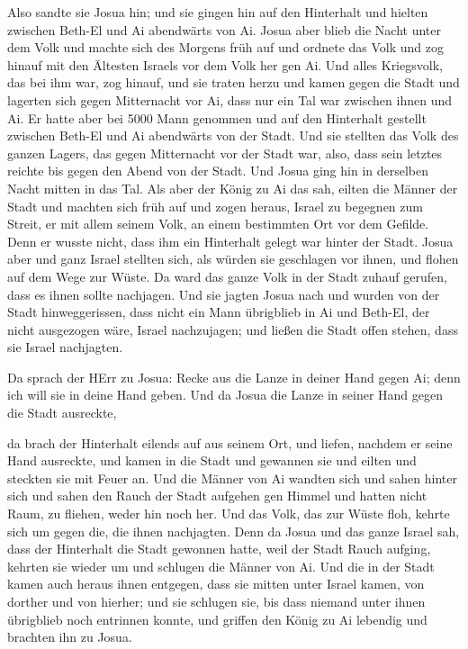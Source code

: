  Also sandte sie Josua hin; und sie gingen hin auf den
Hinterhalt und hielten zwischen Beth-El und Ai abendwärts von Ai. Josua
aber blieb die Nacht unter dem Volk  und machte sich des
Morgens früh auf und ordnete das Volk und zog hinauf mit den Ältesten
Israels vor dem Volk her gen Ai.  Und alles Kriegsvolk, das
bei ihm war, zog hinauf, und sie traten herzu und kamen gegen die Stadt
und lagerten sich gegen Mitternacht vor Ai, dass nur ein Tal war
zwischen ihnen und Ai.  Er hatte aber bei 5000 Mann
genommen und auf den Hinterhalt gestellt zwischen Beth-El und Ai
abendwärts von der Stadt.  Und sie stellten das Volk des
ganzen Lagers, das gegen Mitternacht vor der Stadt war, also, dass sein
letztes reichte bis gegen den Abend von der Stadt. Und Josua ging hin in
derselben Nacht mitten in das Tal.  Als aber der König zu
Ai das sah, eilten die Männer der Stadt und machten sich früh auf und
zogen heraus, Israel zu begegnen zum Streit, er mit allem seinem Volk,
an einem bestimmten Ort vor dem Gefilde. Denn er wusste nicht, dass ihm
ein Hinterhalt gelegt war hinter der Stadt.  Josua aber und
ganz Israel stellten sich, als würden sie geschlagen vor ihnen, und
flohen auf dem Wege zur Wüste.  Da ward das ganze Volk in
der Stadt zuhauf gerufen, dass es ihnen sollte nachjagen. 
Und sie jagten Josua nach und wurden von der Stadt hinweggerissen, dass
nicht ein Mann übrigblieb in Ai und Beth-El, der nicht ausgezogen wäre,
Israel nachzujagen; und ließen die Stadt offen stehen, dass sie Israel
nachjagten.

 Da sprach der HErr zu Josua: Recke aus die Lanze in deiner
Hand gegen Ai; denn ich will sie in deine Hand geben. Und da Josua die
Lanze in seiner Hand gegen die Stadt ausreckte,

 da brach der Hinterhalt eilends auf aus seinem Ort, und
liefen, nachdem er seine Hand ausreckte, und kamen in die Stadt und
gewannen sie und eilten und steckten sie mit Feuer an.  Und
die Männer von Ai wandten sich und sahen hinter sich und sahen den Rauch
der Stadt aufgehen gen Himmel und hatten nicht Raum, zu fliehen, weder
hin noch her. Und das Volk, das zur Wüste floh, kehrte sich um gegen
die, die ihnen nachjagten.  Denn da Josua und das ganze
Israel sah, dass der Hinterhalt die Stadt gewonnen hatte, weil der Stadt
Rauch aufging, kehrten sie wieder um und schlugen die Männer von Ai.
 Und die in der Stadt kamen auch heraus ihnen entgegen,
dass sie mitten unter Israel kamen, von dorther und von hierher; und sie
schlugen sie, bis dass niemand unter ihnen übrigblieb noch entrinnen
konnte,  und griffen den König zu Ai lebendig und brachten
ihn zu Josua.


